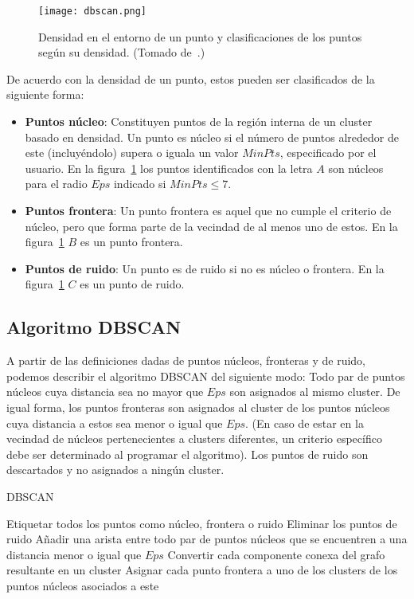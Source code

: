 \begin{figure}[!h]
    \centering
    \texttt{[image: dbscan.png]}
    \caption{Densidad en el entorno de un punto y clasificaciones de los puntos según su densidad. (Tomado de~\cite{Tan05}.)}
    \label{img:dbscan}
\end{figure}

De acuerdo con la densidad de un punto, estos pueden ser clasificados de la siguiente forma:

\begin{itemize}
    \item \textbf{Puntos núcleo}: Constituyen puntos de la región interna de un cluster basado en densidad.
    Un punto es núcleo si el número de puntos alrededor de este (incluyéndolo) supera o iguala un valor $MinPts$, especificado por el usuario.
    En la figura~\ref{img:dbscan} los puntos identificados con la letra $A$ son núcleos para el radio $Eps$ indicado si $MinPts\leq 7$.
    \item \textbf{Puntos frontera}: Un punto frontera es aquel que no cumple el criterio de núcleo, pero que forma parte de la vecindad de al menos uno de estos.
    En la figura~\ref{img:dbscan} $B$ es un punto frontera.
    \item \textbf{Puntos de ruido}: Un punto es de ruido si no es núcleo o frontera.
    En la figura~\ref{img:dbscan} $C$ es un punto de ruido.
\end{itemize}

\subsection{Algoritmo DBSCAN}\label{subsec:DBSCAN}

A partir de las definiciones dadas de puntos núcleos, fronteras y de ruido, podemos describir el algoritmo DBSCAN del siguiente modo: Todo par de puntos núcleos cuya distancia sea no mayor que $Eps$ son asignados al mismo cluster.
De igual forma, los puntos fronteras son asignados al cluster de los puntos núcleos cuya distancia a estos sea menor o igual que $Eps$.
(En caso de estar en la vecindad de núcleos pertenecientes a clusters diferentes, un criterio específico debe ser determinado al programar el algoritmo).
Los puntos de ruido son descartados y no asignados a ningún cluster.

\begin{algorithm}
    \caption{DBSCAN}
    \label{algorithm:DBSCAN}
    Etiquetar todos los puntos como núcleo, frontera o ruido\;
    Eliminar los puntos de ruido\;
    Añadir una arista entre todo par de puntos núcleos que se encuentren a una distancia menor o igual que $Eps$\;
    Convertir cada componente conexa del grafo resultante en un cluster\;
    Asignar cada punto frontera a uno de los clusters de los puntos núcleos asociados a este\;
\end{algorithm}

